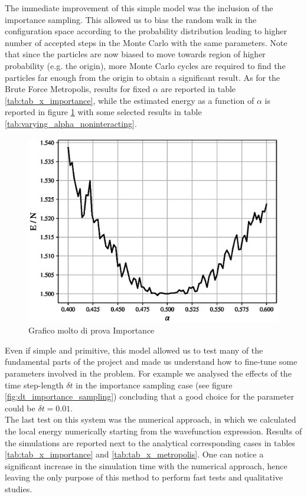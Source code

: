 The immediate improvement of this simple model was the inclusion of the importance sampling. This allowed us to bias the random walk in the configuration space according to the probability distribution leading to higher number of accepted steps in the Monte Carlo with the same parameters. Note that since the particles are now biased to move towards region of higher probability (e.g. the origin), more Monte Carlo cycles are required to find the particles far enough from the origin to obtain a significant result. As for the Brute Force Metropolis, results for fixed $\alpha$ are reported in table \ref{tab:tab_x_importance}, while the estimated energy as a function of $\alpha$ is reported in figure \ref{fig:varying_alpha_noninteract_importance} with some selected results in table \ref{tab:varying_alpha_noninteracting}. \\
\begin{figure}[H]
    \includegraphics[scale=0.5]{images/varying_alpha_noninteract.eps}
    \caption{Grafico molto di prova Importance}
    \label{fig:varying_alpha_noninteract_importance}
\end{figure}
Even if simple and primitive, this model allowed us to test many of the fundamental parts of the project and made us understand how to fine-tune some parameters involved in the problem. For example we analysed the effects of the time step-length $\delta t$ in the importance sampling case (see figure \ref{fig:dt_importance_sampling}) concluding that a good choice for the parameter could be $\delta t = 0.01$. \\
The last test on this system was the numerical approach, in which we calculated the local energy numerically starting from the wavefunction expression. Results of the simulations are reported next to the analytical corresponding cases in tables \ref{tab:tab_x_importance} and \ref{tab:tab_x_metropolis}. One can notice a significant increase in the simulation time with the numerical approach, hence leaving the only purpose of this method to perform fast tests and qualitative studies.
